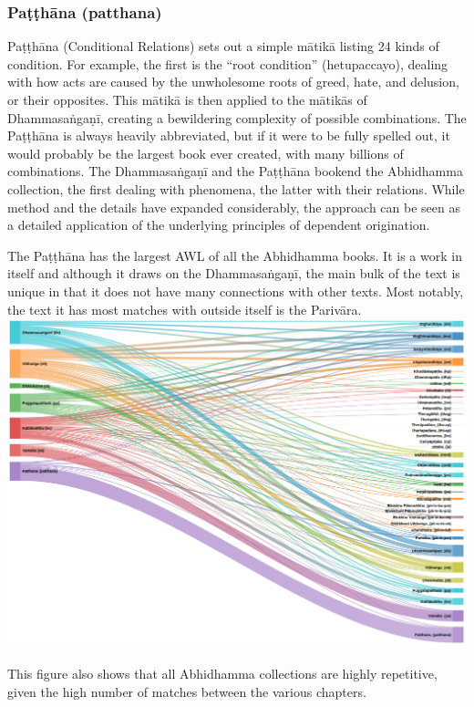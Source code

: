 \subsubsection{Paṭṭhāna (patthana)}
Paṭṭhāna (Conditional Relations) sets out a simple mātikā listing 24 kinds of condition. For example, the first is the “root condition” (hetupaccayo), dealing with how acts are caused by the unwholesome roots of greed, hate, and delusion, or their opposites. This mātikā is then applied to the mātikās of Dhammasaṅgaṇī, creating a bewildering complexity of possible combinations. The Paṭṭhāna is always heavily abbreviated, but if it were to be fully spelled out, it would probably be the largest book ever created, with many billions of combinations. The Dhammasaṅgaṇī and the Paṭṭhāna bookend the Abhidhamma collection, the first dealing with phenomena, the latter with their relations. While method and the details have expanded considerably, the approach can be seen as a detailed application of the underlying principles of dependent origination.

The Paṭṭhāna has the largest AWL of all the Abhidhamma books. It is a work in itself and although it draws on the Dhammasaṅgaṇī, the main bulk of the text is unique in that it does not have many connections with other texts. Most notably, the text it has most matches with outside itself is the Parivāra.\\

\includegraphics[width=\linewidth]{abhidhamma.png}
\label{abhidhamma}

\medskip
This figure also shows that all Abhidhamma collections are highly repetitive, given the high number of matches between the various chapters.

